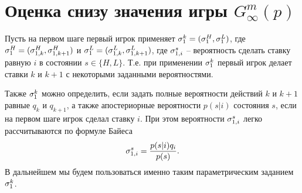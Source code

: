 \section{Оценка снизу значения игры $ G^m_\infty(p) $}
\label{sec:lower_bound}

Пусть на первом шаге первый игрок применяет 
$ \sigma^k_1 = (\sigma^H_1, \sigma^L_1) $, где 
$ \sigma^H_1 = (\sigma^H_{1,k}, \sigma^H_{1,k+1}) $ и 
$ \sigma^L_1 = (\sigma^L_{1,k}, \sigma^L_{1,k+1}) $, где 
$ \sigma^s_{1,i} $ -- вероятность сделать ставку равную $ i $ в состоянии $ s \in \{ H, L \} $.
Т.е. при применении $ \sigma^k_1 $ первый игрок делает ставки $ k $ и $ k + 1 $ с некоторыми заданными вероятностями. 

Также $ \sigma^k_1 $ можно определить, если задать полные вероятности действий $ k $ и $ k + 1 $ равные $ q_k $ и $ q_{k+1} $, а также апостериорные вероятности $ p(s|i) $ состояния $ s $, если на первом шаге игрок сделал ставку $ i $. 
При этом вероятности $ \sigma^s_{1,i} $ легко рассчитываются по формуле Байеса
\[
    \sigma^s_{1,i} = \frac{p(s|i)q_i}{p(s)}.
\]
В дальнейшем мы будем пользоваться именно таким параметрическим заданием $ \sigma^k_1 $.

